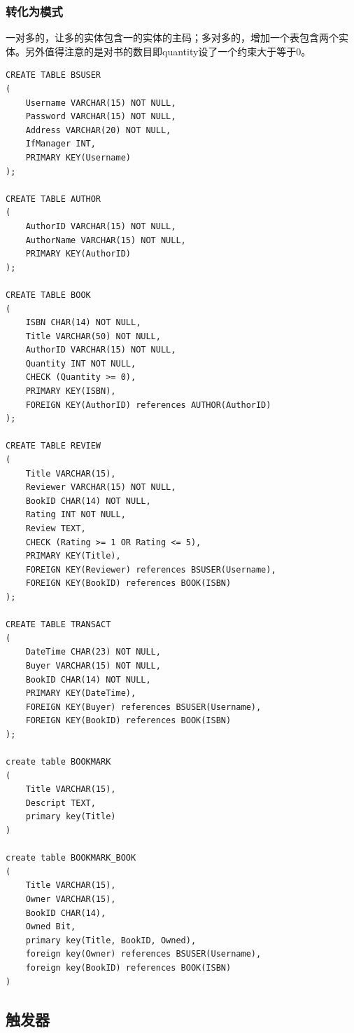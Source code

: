 \documentclass[UTF8, a4paper, 11pt]{article}
\begin{document}
\subsubsection{转化为模式}
一对多的，让多的实体包含一的实体的主码；多对多的，增加一个表包含两个实体。另外值得注意的是对书的数目即quantity设了一个约束大于等于0。
\begin{lstlisting}
CREATE TABLE BSUSER
(
    Username VARCHAR(15) NOT NULL,
    Password VARCHAR(15) NOT NULL,
    Address VARCHAR(20) NOT NULL,
    IfManager INT,
    PRIMARY KEY(Username)
);

CREATE TABLE AUTHOR
(
    AuthorID VARCHAR(15) NOT NULL,
    AuthorName VARCHAR(15) NOT NULL,
    PRIMARY KEY(AuthorID)
);

CREATE TABLE BOOK
(
    ISBN CHAR(14) NOT NULL,
    Title VARCHAR(50) NOT NULL,
    AuthorID VARCHAR(15) NOT NULL,
    Quantity INT NOT NULL,
    CHECK (Quantity >= 0),
    PRIMARY KEY(ISBN),
    FOREIGN KEY(AuthorID) references AUTHOR(AuthorID)
);

CREATE TABLE REVIEW
(
    Title VARCHAR(15),
    Reviewer VARCHAR(15) NOT NULL,
    BookID CHAR(14) NOT NULL,
    Rating INT NOT NULL,
    Review TEXT,
    CHECK (Rating >= 1 OR Rating <= 5),
    PRIMARY KEY(Title),
    FOREIGN KEY(Reviewer) references BSUSER(Username),
    FOREIGN KEY(BookID) references BOOK(ISBN)
);

CREATE TABLE TRANSACT
(
    DateTime CHAR(23) NOT NULL,
    Buyer VARCHAR(15) NOT NULL,
    BookID CHAR(14) NOT NULL,
    PRIMARY KEY(DateTime),
    FOREIGN KEY(Buyer) references BSUSER(Username),
    FOREIGN KEY(BookID) references BOOK(ISBN)
);

create table BOOKMARK
(
    Title VARCHAR(15),
    Descript TEXT,
    primary key(Title)
)

create table BOOKMARK_BOOK
(
    Title VARCHAR(15),
    Owner VARCHAR(15),
    BookID CHAR(14),
    Owned Bit,
    primary key(Title, BookID, Owned),
    foreign key(Owner) references BSUSER(Username),
    foreign key(BookID) references BOOK(ISBN)
)
\end{lstlisting}
\subsection{触发器}
\end{document}
